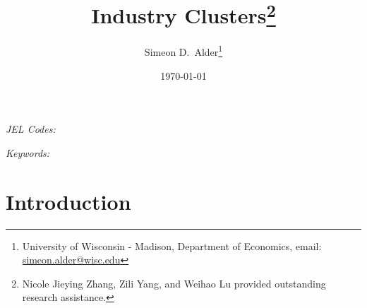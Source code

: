 \documentclass[onehalfspacing,11pt]{article}
\begin{document}
\begin{titlepage}

\title{Industry Clusters\footnote{Nicole Jieying Zhang, Zili Yang, and Weihao Lu provided outstanding research assistance.}}

\author{Simeon D.~Alder\footnote{University of Wisconsin - Madison, Department of Economics, email: \url{simeon.alder@wisc.edu}}}
\date{\today} %

\maketitle

\begin{abstract}

\end{abstract}
\noindent
\textit{JEL Codes:} 

\textit{Keywords:} 
\end{titlepage}


\section{Introduction}
%
\end{document}
